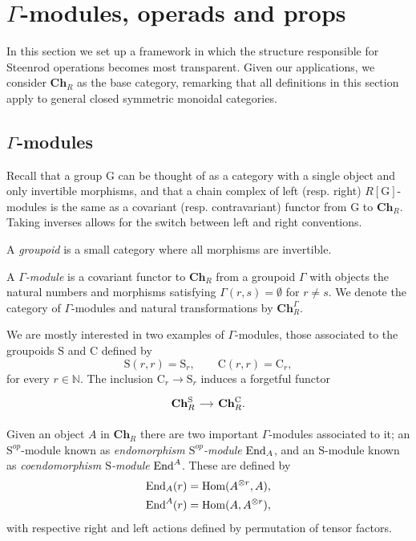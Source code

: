 
\section{\texorpdfstring{$\Gamma$}{Gamma}-modules, operads and props} \label{s:operads}

In this section we set up a framework in which the structure responsible for Steenrod operations becomes most transparent.
Given our applications, we consider $\mathbf{Ch}_R$ as the base category, remarking that all definitions in this section apply to general closed symmetric monoidal categories.

\subsection{$\Gamma$-modules}
Recall that a group $\mathrm G$ can be thought of as a category with a single object and only invertible morphisms, and that a chain complex of left (resp. right) $R[\mathrm G]$-modules is the same as a covariant (resp. contravariant) functor from $\mathrm G$ to $\mathbf{Ch}_R$.
Taking inverses allows for the switch between left and right conventions.

A \textit{groupoid} is a small category where all morphisms are invertible.
\begin{definition}
	A \textit{$\Gamma$-module} is a covariant functor to $\mathbf{Ch}_R$ from a groupoid $\Gamma$ with objects the natural numbers and morphisms satisfying $\Gamma(r,s) = \emptyset$ for $r \neq s$.
	We denote the category of $\Gamma$-modules and natural transformations by $\mathbf{Ch}_R^\Gamma$.
\end{definition}

We are mostly interested in two examples of $\Gamma$-modules, those associated to the groupoids $\mathrm{S}$ and $\mathrm{C}$ defined by
\begin{equation*}
\mathrm{S}(r, r) = \mathrm{S}_r, \qquad
\mathrm{C}(r,r) = \mathrm{C}_r,
\end{equation*}
for every $r \in \mathbb{N}$.
The inclusion $\mathrm{C}_r \to \mathrm{S}_r$ induces a forgetful functor
\begin{equation*}
\begin{tikzcd} [column sep = small]
\mathbf{Ch}_R^\mathrm{S} \arrow[r] & \mathbf{Ch}_R^\mathrm{C}.
\end{tikzcd}
\end{equation*}

Given an object $A$ in $\mathbf{Ch}_R$ there are two important $\Gamma$-modules associated to it; an $\mathrm{S}^{op}$-module known as \textit{endomorphism $\mathrm{S}^{op}$-module} $\mathrm{End}_A$, and an $\mathrm{S}$-module known as \textit{coendomorphism $\mathrm{S}$-module} $\mathrm{End}^A$.
These are defined by
\begin{align*}
\mathrm{End}_A(r) &= \mathrm{Hom}(A^{\otimes r},A), \\
\mathrm{End}^A(r) &= \mathrm{Hom}(A,A^{\otimes r}),
\end{align*}
with respective right and left actions defined by permutation of tensor factors.

